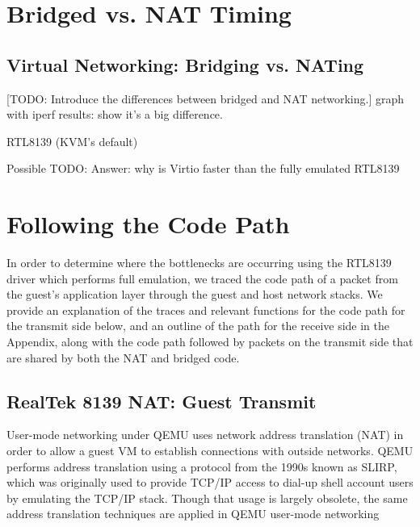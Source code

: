 \documentclass[11pt,pdftex,twocolumn]{article}
\begin{document}
\section{Bridged vs. NAT Timing}
\label{sec:NFSTiming}	


\subsection{Virtual Networking: Bridging vs. NATing}
\label{subsec:bridgeVsNAT}
[TODO: Introduce the differences between bridged and NAT networking.]
graph with iperf results: show it's a big difference.

RTL8139 (KVM's default)

Possible TODO: Answer: why is Virtio faster than the fully emulated RTL8139

\section{Following the Code Path}
In order to determine where the bottlenecks are occurring using the RTL8139 driver which performs full emulation, we traced the code path of a packet from the guest's application layer through the guest and host network stacks. We provide an explanation of the traces and relevant functions for the code path for the transmit side below, and an outline of the path for the receive side in the Appendix, along with the code path followed by packets on the transmit side that are shared by both the NAT and bridged code. 


\subsection{RealTek 8139 NAT: Guest Transmit}
User-mode networking under QEMU uses network address translation (NAT) in order to allow a guest VM to establish connections with outside networks. QEMU performs address translation using a protocol from the 1990s known as SLIRP, which was originally used to provide TCP/IP access to dial-up shell account users by emulating the TCP/IP stack. Though that usage is largely obsolete, the same address translation techniques are applied in QEMU user-mode networking 
\end{document}
